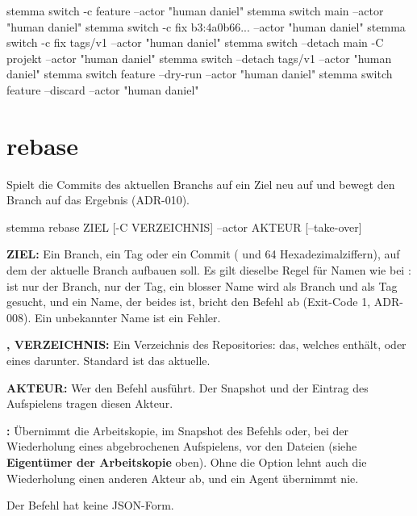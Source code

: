 \starttyping
stemma switch -c feature --actor "human daniel"
stemma switch main --actor "human daniel"
stemma switch -c fix b3:4a0b66... --actor "human daniel"
stemma switch -c fix tags/v1 --actor "human daniel"
stemma switch --detach main -C projekt --actor "human daniel"
stemma switch --detach tags/v1 --actor "human daniel"
stemma switch feature --dry-run --actor "human daniel"
stemma switch feature --discard --actor "human daniel"
\stoptyping

\section{rebase}

Spielt die Commits des aktuellen Branchs auf ein Ziel neu auf und bewegt den Branch auf das
Ergebnis (ADR-010).

\starttyping
stemma rebase ZIEL [-C VERZEICHNIS] --actor AKTEUR [--take-over]
\stoptyping

\startitemize
\item {\bf ZIEL:} Ein Branch, ein Tag oder ein Commit ( und 64 Hexadezimalziffern),
auf dem der aktuelle Branch aufbauen soll. Es gilt dieselbe Regel für Namen wie bei
:  ist nur der Branch,  nur der Tag,
ein blosser Name wird als Branch und als Tag gesucht, und ein Name, der beides ist, bricht den
Befehl ab (Exit-Code 1, ADR-008). Ein unbekannter Name ist ein Fehler.
\item {\bf {},  VERZEICHNIS:} Ein Verzeichnis des Repositories:
das, welches  enthält, oder eines darunter. Standard ist das aktuelle.
\item {\bf {} AKTEUR:} Wer den Befehl ausführt. Der Snapshot und der
Eintrag des Aufspielens tragen diesen Akteur.
\item {\bf {}:} Übernimmt die Arbeitskopie, im Snapshot des Befehls oder,
bei der Wiederholung eines abgebrochenen Aufspielens, vor den Dateien
(siehe {\bf Eigentümer der Arbeitskopie} oben).
Ohne die Option lehnt auch die Wiederholung einen anderen Akteur ab, und ein Agent übernimmt nie.
\stopitemize

Der Befehl hat keine JSON-Form.

